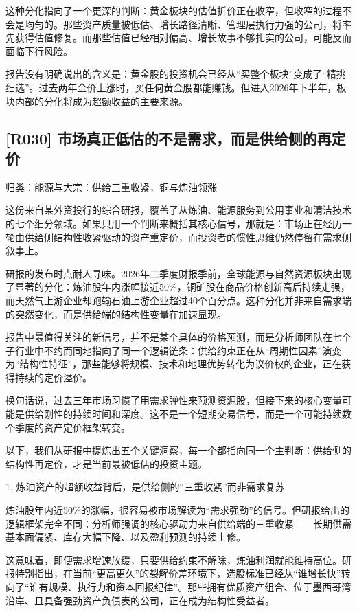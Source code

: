\documentclass[11pt]{ctexart}
\begin{document}
这种分化指向了一个更深的判断：黄金板块的估值折价正在收窄，但收窄的过程不会是均匀的。那些资产质量被低估、增长路径清晰、管理层执行力强的公司，将率先获得估值修复。而那些估值已经相对偏高、增长故事不够扎实的公司，可能反而面临下行风险。

报告没有明确说出的含义是：黄金股的投资机会已经从“买整个板块”变成了“精挑细选”。过去两年金价上涨时，买任何黄金股都能赚钱。但进入2026年下半年，板块内部的分化将成为超额收益的主要来源。

\subsection{[R030] 市场真正低估的不是需求，而是供给侧的再定价}
{\small\color{refgray}归类：能源与大宗：供给三重收紧，铜与炼油领涨}

这份来自某外资投行的综合研报，覆盖了从炼油、能源服务到公用事业和清洁技术的七个细分领域。如果只用一个判断来概括其核心信号，那就是：市场正在经历一轮由供给侧结构性收紧驱动的资产重定价，而投资者的惯性思维仍然停留在需求侧叙事上。

研报的发布时点耐人寻味。2026年二季度财报季前，全球能源与自然资源板块出现了显著的分化：炼油股年内涨幅接近50\%，铜矿股在商品价格创新高后持续走强，而天然气上游企业却跑输石油上游企业超过40个百分点。这种分化并非来自需求端的突然变化，而是供给端的结构性变量在加速显现。

报告中最值得关注的新信号，并不是某个具体的价格预测，而是分析师团队在七个子行业中不约而同地指向了同一个逻辑链条：供给约束正在从“周期性因素”演变为“结构性特征”，那些能够将规模、技术和地理优势转化为议价权的企业，正在获得持续的定价溢价。

换句话说，过去三年市场习惯了用需求弹性来预测资源股，但接下来的核心变量可能是供给刚性的持续时间和深度。这不是一个短期交易信号，而是一个可能持续数个季度的资产定价框架转变。

以下，我们从研报中提炼出五个关键洞察，每一个都指向同一个主判断：供给侧的结构性再定价，才是当前最被低估的投资主题。

1. 炼油资产的超额收益背后，是供给侧的“三重收紧”而非需求复苏

炼油股年内近50\%的涨幅，很容易被市场解读为“需求强劲”的信号。但研报给出的逻辑框架完全不同：分析师强调的核心驱动力来自供给端的三重收紧——长期供需基本面偏紧、库存大幅下降、以及盈利预测的持续上修。

这意味着，即便需求增速放缓，只要供给约束不解除，炼油利润就能维持高位。研报特别指出，在当前“更高更久”的裂解价差环境下，选股标准已经从“谁增长快”转向了“谁有规模、执行力和资本回报纪律”。那些拥有优质资产组合、位于墨西哥湾沿岸、且具备强劲资产负债表的公司，正在成为结构性受益者。
\end{document}
